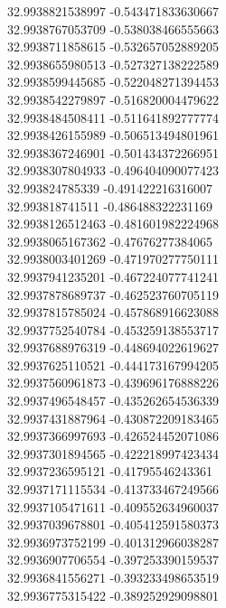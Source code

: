 {32.9938821538997	-0.543471833630667\\
32.9938767053709	-0.538038466555663\\
32.9938711858615	-0.532657052889205\\
32.9938655980513	-0.527327138222589\\
32.9938599445685	-0.522048271394453\\
32.9938542279897	-0.516820004479622\\
32.9938484508411	-0.511641892777774\\
32.9938426155989	-0.506513494801961\\
32.9938367246901	-0.501434372266951\\
32.9938307804933	-0.496404090077423\\
32.993824785339	-0.491422216316007\\
32.993818741511	-0.486488322231169\\
32.9938126512463	-0.481601982224968\\
32.9938065167362	-0.47676277384065\\
32.9938003401269	-0.471970277750111\\
32.9937941235201	-0.467224077741241\\
32.9937878689737	-0.462523760705119\\
32.9937815785024	-0.457868916623088\\
32.9937752540784	-0.453259138553717\\
32.9937688976319	-0.448694022619627\\
32.9937625110521	-0.444173167994205\\
32.9937560961873	-0.439696176888226\\
32.9937496548457	-0.435262654536339\\
32.9937431887964	-0.430872209183465\\
32.9937366997693	-0.426524452071086\\
32.9937301894565	-0.422218997423434\\
32.9937236595121	-0.41795546243361\\
32.9937171115534	-0.413733467249566\\
32.9937105471611	-0.409552634960037\\
32.9937039678801	-0.405412591580373\\
32.9936973752199	-0.401312966038287\\
32.9936907706554	-0.397253390159537\\
32.9936841556271	-0.393233498653519\\
32.9936775315422	-0.389252929098801\\
}
